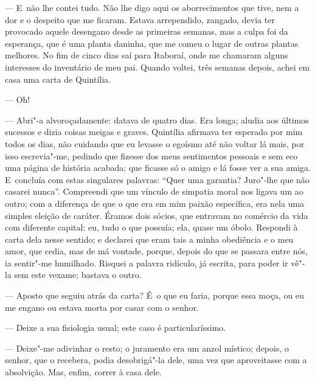 \begin{linenumbers}
--- E~não lhe contei tudo. Não lhe digo aqui os aborrecimentos que tive,
nem a dor e o despeito que me ficaram. Estava arrependido, zangado,
devia ter provocado aquele desengano desde as primeiras semanas, mas a
culpa foi da esperança, que é uma planta daninha, que me comeu o lugar
de outras plantas melhores. No fim de cinco dias saí para Itaboraí, onde
me chamaram alguns interesses do inventário de meu pai. Quando voltei,
três semanas depois, achei em casa uma carta de Quintília.

--- Oh!

--- Abri"-a alvoroçadamente: datava de quatro dias. Era longa; aludia aos
últimos sucessos e dizia coisas meigas e graves. Quintília afirmava ter
esperado por mim todos os dias, não cuidando que eu levasse o egoísmo
até não voltar lá mais, por isso escrevia"-me, pedindo que fizesse dos
meus sentimentos pessoais e sem eco uma página de história acabada; que
ficasse só o amigo e lá fosse ver a sua amiga. E~concluía com estas
singulares palavras: ``Quer uma garantia? Juro"-lhe que não casarei
nunca''. Compreendi que um vínculo de simpatia moral nos ligava um ao
outro; com a diferença de que o que era em mim paixão específica, era
nela uma simples eleição de caráter. Éramos dois sócios, que entravam no
comércio da vida com diferente capital: eu, tudo o que possuía; ela,
quase um óbolo. Respondi à carta dela nesse sentido; e declarei que eram
tais a minha obediência e o meu amor, que cedia, mas de má vontade,
porque, depois do que se passara entre nós, ia sentir"-me humilhado.
Risquei a palavra ridículo, já escrita, para poder ir vê"-la sem este
vexame; bastava o outro.

--- Aposto que seguiu atrás da carta? É~o que eu faria, porque essa moça,
ou eu me engano ou estava morta por casar com o senhor.

--- Deixe a sua fisiologia usual; este caso é particularíssimo.

--- Deixe"-me adivinhar o resto; o juramento era um anzol místico; depois,
o senhor, que o recebera, podia desobrigá"-la dele, uma vez que
aproveitasse com a absolvição. Mas, enfim, correr à casa dele.


\end{linenumbers}
